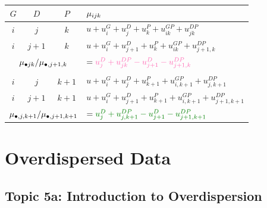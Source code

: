 \documentclass[oneside]{book}\usepackage[]{graphicx}\usepackage[svgnames]{xcolor}
\let\log\relax%
\begin{document}
\begin{table}[H]
    \centering
    \begin{tabular}{cccl}
        $ G $                                                                   & $ D $                                                                     & $ P $   & $ \log{\mu_{ijk}} $                                             \\
        \midrule
        $ i $                                                                   & $ j $                                                                     & $ k $   & $ u+u_i^G+u_j^D+u_k^P+u_{ik}^{GP}+u_{jk}^{DP} $                 \\
        $ i $                                                                   & $ j+1 $                                                                   & $ k $   & $ u+u_i^G+u_{j+1}^D+u_k^P+u_{ik}^{GP}+u_{j+1,k}^{DP} $          \\
        \midrule
        \multicolumn{3}{c}{$ \log{\mu_{\bullet jk}/\mu_{\bullet,j+1,k}} $}      & $ =\textcolor{HotPink}{u_j^D+u_{jk}^{DP}-u_{j+1}^{D}-u_{j+1,k}^{DP}} $                                                                                \\\\
        \midrule
        $ i $                                                                   & $ j $                                                                     & $ k+1 $ & $ u+u_i^G+u_{j}^D+u_{k+1}^P+u_{i,k+1}^{GP}+u_{j,k+1}^{DP} $     \\
        $ i $                                                                   & $ j+1 $                                                                   & $ k+1 $ & $ u+u_i^G+u_{j+1}^D+u_{k+1}^P+u_{i,k+1}^{GP}+u_{j+1,k+1}^{DP} $ \\
        \midrule
        \multicolumn{3}{c}{$ \log{\mu_{\bullet,j,k+1}/\mu_{\bullet,j+1,k+1}} $} & $ =\textcolor{Green}{u_j^D+u_{j,k+1}^{DP}-u_{j+1}^{D}-u_{j+1,k+1}^{DP}} $
    \end{tabular}
\end{table}

\chapter{Overdispersed Data}
\section*{Topic 5a: Introduction to Overdispersion}
\end{document}
